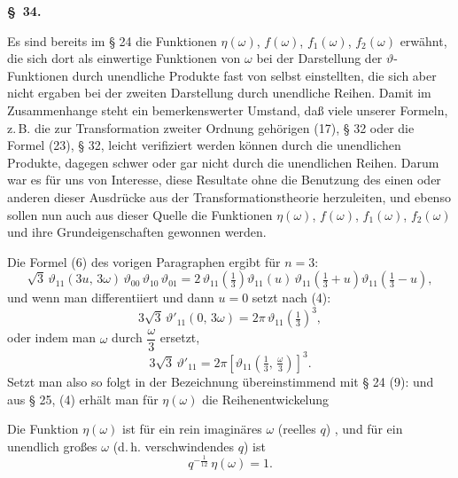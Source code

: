 
\begin{center}
\textbf{\S\ 34. }
\end{center}

Es sind bereits im § 24 die Funktionen $\eta(\omega)$, $f(\omega)$, $f_1(\omega)$,
$f_2(\omega)$ erwähnt, die sich dort als einwertige Funktionen von $\omega$ bei der
Darstellung der $\vartheta$-Funktionen durch unendliche Produkte fast von selbst
einstellten, die sich aber nicht ergaben bei der zweiten Darstellung durch unendliche
Reihen. Damit im Zusammenhange steht ein bemerkenswerter Umstand, daß viele unserer
Formeln, z.\,B. die zur Transformation zweiter Ordnung gehörigen (17), § 32 oder die
Formel (23), § 32, leicht verifiziert werden können durch die unendlichen Produkte,
dagegen schwer oder gar nicht durch die unendlichen Reihen. Darum war es für uns von
Interesse, diese Resultate ohne die Benutzung des einen oder anderen dieser Ausdrücke
aus der Transformationstheorie herzuleiten, und ebenso sollen nun auch aus dieser
Quelle die Funktionen $\eta(\omega)$, $f(\omega)$, $f_1(\omega)$, $f_2(\omega)$ und
ihre Grundeigenschaften gewonnen werden.

Die Formel (6) des vorigen Paragraphen ergibt für $n=3$:
\[
\sqrt{3}\,\vartheta_{11}(3u,\,3\omega)\,\vartheta_{00}\,\vartheta_{10}\,\vartheta_{01}
= 2\,\vartheta_{11}\!\left(\tfrac{1}{3}\right)\vartheta_{11}(u)\,
\vartheta_{11}\!\left(\tfrac{1}{3}+u\right)\vartheta_{11}\!\left(\tfrac{1}{3}-u\right),
\]
und wenn man differentiiert und dann $u=0$ setzt nach (4):
\[
3\sqrt{3}\,\vartheta'_{11}(0,\,3\omega) = 2\pi\,\vartheta_{11}\!\left(\tfrac{1}{3}\right)^3,
\]
oder indem man $\omega$ durch $\dfrac{\omega}{3}$ ersetzt,
\[
3\sqrt{3}\,\vartheta'_{11} = 2\pi\left[\vartheta_{11}\!\left(\tfrac{1}{3},\,\tfrac{\omega}{3}\right)\right]^3.
\]
Setzt man also
so folgt in der Bezeichnung übereinstimmend mit § 24 (9):
und aus § 25, (4) erhält man für $\eta(\omega)$ die Reihenentwickelung

Die Funktion $\eta(\omega)$ ist für ein rein imaginäres $\omega$ (reelles $q$) ,
und für ein unendlich großes $\omega$ (d.\,h. verschwindendes $q$) ist
\[
q^{-\frac{1}{12}}\,\eta(\omega) = 1.
\]
